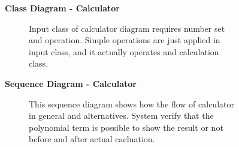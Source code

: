 \documentclass{article}
\begin{document}
		\begin{figure}[htbp]
			\textbf{Class Diagram - Calculator}
			\centering
			\begin{subfigure}{\textwidth}
				\resizebox{\textwidth}{!}{}
			\end{subfigure}
			\begin{subfigure}{\textwidth}
				Input class of calculator diagram requires number set and operation. Simple operations are just applied in input class, and it actually operates and calculation class.
			\end{subfigure}
		\end{figure}
		\clearpage
		
		\begin{figure}[htbp]
			\textbf{Sequence Diagram - Calculator}
			\centering
			\begin{subfigure}{\textwidth}
				\centering
				\scalebox{0.8}{}
			\end{subfigure}
			\begin{subfigure}{\textwidth}
				This sequence diagram shows how the flow of calculator in general and alternatives. System verify that the polynomial term is possible to show the result or not before and after actual cacluation.
			\end{subfigure}
		\end{figure}
		\clearpage   
		
\end{document}
